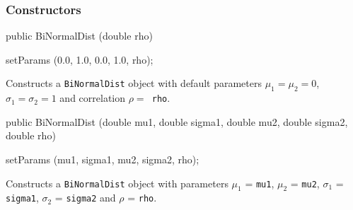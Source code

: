 \subsubsection* {Constructors}

\begin{code}

   public BiNormalDist (double rho) \begin{hide} {
      setParams (0.0, 1.0, 0.0, 1.0, rho);
   }\end{hide}
\end{code}
\begin{tabb}
 Constructs a \texttt{BiNormalDist} object with default parameters $\mu_1 = \mu_2 =
  0$, $\sigma_1 = \sigma_2 = 1$ and correlation $\rho = $\texttt{ rho}.
  \end{tabb}
\begin{code}

   public BiNormalDist (double mu1, double sigma1,
                        double mu2, double sigma2, double rho) \begin{hide} {
      setParams (mu1, sigma1, mu2, sigma2, rho);
   }\end{hide}
\end{code}
\begin{tabb}
 Constructs a \texttt{BiNormalDist} object with parameters $\mu_1$ = \texttt{mu1},
 $\mu_2$ = \texttt{mu2}, $\sigma_1$ = \texttt{sigma1},  $\sigma_2$ = 
 \texttt{sigma2} and $\rho$ = \texttt{rho}.   
  \end{tabb}

